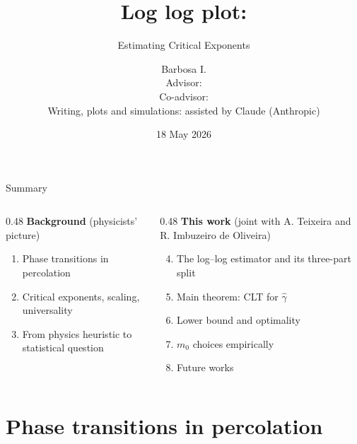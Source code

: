 \documentclass[10pt, aspectratio=169, xcolor={table}]{beamer}
\title{Log log plot:}
\subtitle{Estimating Critical Exponents}
\author{Barbosa I.\\[0.6em]
  {\footnotesize Advisor: \theadvisor\\
   Co-advisor: \thecoadvisor\\[0.4em]
   Writing, plots and simulations: assisted by Claude (Anthropic)}}
\institute{IMPA -- Instituto Nacional de Matemática Pura e Aplicada}
\date{18 May 2026}
\begin{document}
\maketitle

\begin{frame}{Summary}
  \begin{columns}[T,onlytextwidth]
    \begin{column}{0.48\textwidth}
      \textbf{Background} \footnotesize(physicists' picture)\normalsize
      \begin{enumerate}
        \item Phase transitions in percolation
        \item Critical exponents, scaling, universality
        \item From physics heuristic to statistical question\\
      \end{enumerate}
    \end{column}
    \begin{column}{0.48\textwidth}
      \textbf{This work} \footnotesize(joint with A. Teixeira and
      R. Imbuzeiro de Oliveira)\normalsize
      \begin{enumerate}\setcounter{enumi}{3}
        \item The log--log estimator and its three-part split
        \item Main theorem: CLT for $\hat\gamma$
        \item Lower bound and optimality
        \item $m_0$ choices empirically
        \item Future works
      \end{enumerate}
    \end{column}
  \end{columns}
\end{frame}

\section{Phase transitions in percolation}
\end{document}
